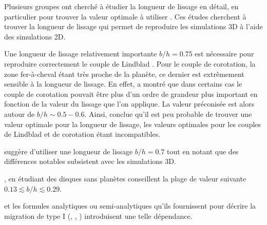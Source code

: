 Plusieurs groupes ont cherché à étudier la longueur de lissage en détail, en particulier pour trouver la valeur optimale à
utiliser \citep{hure2009local, muller2012treating}. Ces études cherchent à trouver la longueur de lissage qui permet de
reproduire les simulations 3D à l'aide des simulations 2D. 

Une longueur de lissage relativement importante $b/h = 0.75$ est nécessaire pour reproduire correctement le couple de Lindblad
\citep{masset2002coorbital}. Pour le couple de corotation, la zone fer-à-cheval étant très proche de la planète, ce dernier est
extrêmement sensible à la longueur de lissage. En effet, \cite{masset2002coorbital} a montré que dans certains cas le couple de
corotation pouvait être plus d'un ordre de grandeur plus important en fonction de la valeur du lissage que l'on applique. La
valeur préconisée est alors autour de $b/h\sim 0.5-0.6$. Ainsi, \cite{masset2002coorbital} conclue qu'il est peu probable de
trouver une valeur optimale pour la longueur de lissage, les valeurs optimales pour les couples de Lindblad et de corotation
étant incompatibles. 

\cite{muller2012treating} suggère d'utiliser une longueur de lissage $b/h = 0.7$ tout en notant que des différences notables
subsistent avec les simulations 3D. 

\cite{hure2009local}, en étudiant des disques sans planètes conseillent la plage de valeur suivante $0.13 \lesssim b/h \lesssim
0.29$.

\bigskip

\cite{paardekooper2010torque, paardekooper2011torque} et les formules analytiques ou semi-analytiques qu'ils fournissent pour
décrire la migration de type I (, ,
) introduisent une telle dépendance. 

